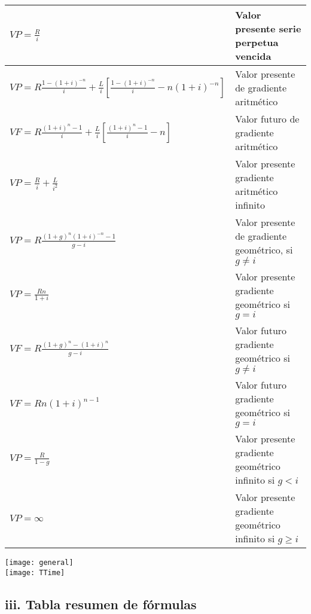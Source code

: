 \begin{spacing}{1}
\begin{center}
\begin{tabular}{ |p{7cm}|p{7cm}|}
			$VP = \frac{R}{i}$                                                                           & Valor presente serie perpetua vencida                      \\ \hline
			$VP = R  \frac{1-(1 + i)^{-n}}{i} + \frac{L}{i}[ \frac{1-(1 + i)^{-n}}{i} - n(1 + i)^{-n} ]$ & Valor presente de gradiente aritmético                     \\ \hline
			$VF = R  \frac{(1 + i)^{n} - 1}{i} + \frac{L}{i}[ \frac{(1 + i)^n - 1}{i} - n ]$             & Valor futuro de gradiente aritmético                       \\ \hline
			$VP = \frac{R}{i} + \frac{L}{i^2}$                                                           & Valor presente gradiente aritmético infinito               \\ \hline
			$VP = R  \frac{(1 + g)^n  (1 + i)^{-n}-1}{g - i} $                                           & Valor presente de gradiente geométrico, si $g \neq i$      \\ \hline
			$VP = \frac{Rn}{1 + i}$                                                                      & Valor presente gradiente geométrico si $g = i$             \\ \hline
			$VF = R  \frac{(1 + g)^n - (1 + i)^n}{g - i} $                                               & Valor futuro gradiente geométrico si $g \neq i$            \\ \hline
			$VF = Rn(1 + i)^{n-1} $                                                                      & Valor futuro gradiente geométrico si $g = i$               \\ \hline
			$VP = \frac{R}{1 - g} $                                                                      & Valor presente gradiente geométrico infinito si $g < i$    \\ \hline
			$VP = \infty $                                                                               & Valor presente gradiente geométrico infinito si $g \geq i$ \\ \hline
		\end{tabular}
		
		\clearpage
		\texttt{[image: general]}\\
		\texttt{[image: TTime]}
	\end{center}
\end{spacing}

\clearpage

\begin{center}
	\section*{iii. Tabla resumen de fórmulas}
\end{center}


